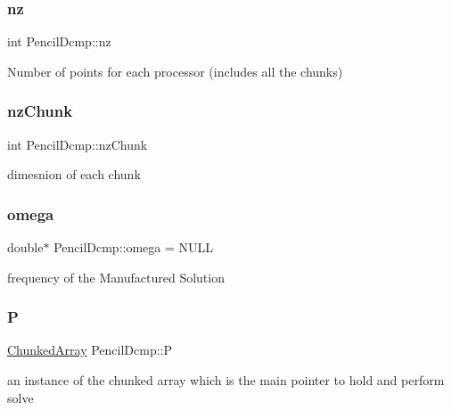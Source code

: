 \subsubsection{\texorpdfstring{nz}{nz}}
{\footnotesize\ttfamily int Pencil\+Dcmp\+::nz\hspace{0.3cm}{\ttfamily [protected]}}

Number of points for each processor (includes all the chunks) \mbox{\label{classPencilDcmp_af606d599e42ca97ed639e4b4a633e691}} 
\subsubsection{\texorpdfstring{nz\+Chunk}{nzChunk}}
{\footnotesize\ttfamily int Pencil\+Dcmp\+::nz\+Chunk\hspace{0.3cm}{\ttfamily [protected]}}

dimesnion of each chunk \mbox{\label{classPencilDcmp_a8b8e20d0f2241d0e9f16b55647f35cc6}} 
\subsubsection{\texorpdfstring{omega}{omega}}
{\footnotesize\ttfamily double$\ast$ Pencil\+Dcmp\+::omega = N\+U\+LL\hspace{0.3cm}{\ttfamily [protected]}}

frequency of the Manufactured Solution \mbox{\label{classPencilDcmp_a5e2f2da0cb460d3307c9f4a4429a7104}} 
\subsubsection{\texorpdfstring{P}{P}}
{\footnotesize\ttfamily \mbox{\hyperlink{classChunkedArray}{Chunked\+Array}} Pencil\+Dcmp\+::P\hspace{0.3cm}{\ttfamily [protected]}}

an instance of the chunked array which is the main pointer to hold and perform solve \mbox{\label{classPencilDcmp_a38a178b9176b286ceb4daa5e5a27df0f}} 
